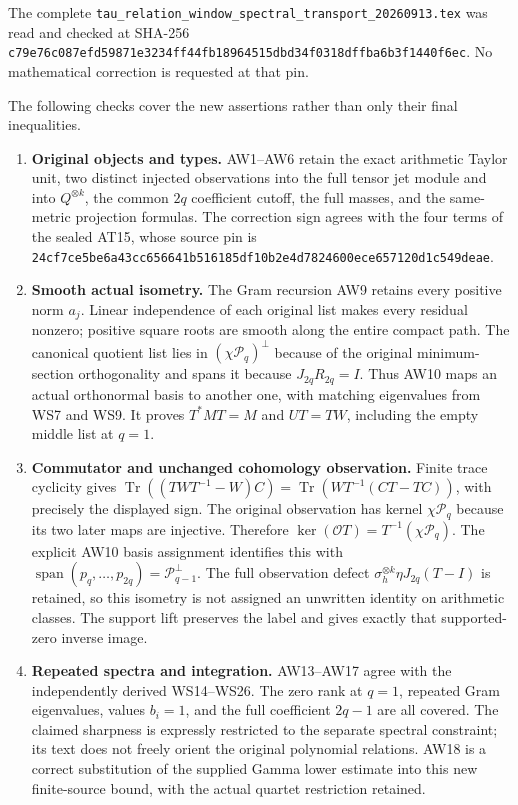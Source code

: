The complete \nolinkurl{tau_relation_window_spectral_transport_20260913.tex} was read and checked at SHA-256 \nolinkurl{c79e76c087efd59871e3234ff44fb18964515dbd34f0318dffba6b3f1440f6ec}. No mathematical correction is requested at that pin.

The following checks cover the new assertions rather than only their final inequalities.

\begin{enumerate}
\def\labelenumi{\arabic{enumi}.}
\tightlist
\item
  \textbf{Original objects and types.} AW1--AW6 retain the exact arithmetic Taylor unit, two distinct injected observations into the full tensor jet module and into \(Q^{\otimes k}\), the common \(2q\) coefficient cutoff, the full masses, and the same-metric projection formulas. The correction sign agrees with the four terms of the sealed AT15, whose source pin is \nolinkurl{24cf7ce5be6a43cc656641b516185df10b2e4d7824600ece657120d1c549deae}.
\item
  \textbf{Smooth actual isometry.} The Gram recursion AW9 retains every positive norm \(a_j\). Linear independence of each original list makes every residual nonzero; positive square roots are smooth along the entire compact path. The canonical quotient list lies in \((\chi\mathcal P_q)^\perp\) because of the original minimum-section orthogonality and spans it because \(J_{2q}R_{2q}=I\). Thus AW10 maps an actual orthonormal basis to another one, with matching eigenvalues from WS7 and WS9. It proves \(T^*MT=M\) and \(UT=TW\), including the empty middle list at \(q=1\).
\item
  \textbf{Commutator and unchanged cohomology observation.} Finite trace cyclicity gives \(\operatorname{Tr}((TWT^{-1}-W)C)=\operatorname{Tr}(WT^{-1}(CT-TC))\), with precisely the displayed sign. The original observation has kernel \(\chi\mathcal P_q\) because its two later maps are injective. Therefore \(\ker(\mathcal O T)=T^{-1}(\chi\mathcal P_q)\). The explicit AW10 basis assignment identifies this with \(\operatorname{span}(p_q,\ldots,p_{2q})=\mathcal P_{q-1}^{\perp}\). The full observation defect \(\sigma_h^{\otimes k}\eta J_{2q}(T-I)\) is retained, so this isometry is not assigned an unwritten identity on arithmetic classes. The support lift preserves the label and gives exactly that supported-zero inverse image.
\item
  \textbf{Repeated spectra and integration.} AW13--AW17 agree with the independently derived WS14--WS26. The zero rank at \(q=1\), repeated Gram eigenvalues, values \(b_i=1\), and the full coefficient \(2q-1\) are all covered. The claimed sharpness is expressly restricted to the separate spectral constraint; its text does not freely orient the original polynomial relations. AW18 is a correct substitution of the supplied Gamma lower estimate into this new finite-source bound, with the actual quartet restriction retained.

\end{enumerate}
